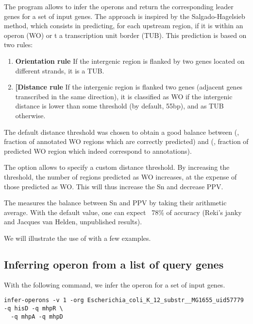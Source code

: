 The program  allows to infer the operons and
return the corresponding leader genes for a set of input genes.  The
approach is inspired by the Salgado-Hagelsieb method, which consists
in predicting, for each upstream region, if it is within an operon
(WO) or t a transcription unit border (TUB). This prediction is based
on two rules:

\begin{enumerate}
\item \textbf{Orientation rule} If the intergenic region is flanked by two
  genes located on different strands, it is a TUB.

\item \textbf{[Distance rule} If the intergenic region is flanked two
   genes (adjacent genes transcribed in the same
  direction), it is classified as WO if the intergenic distance is
  lower than some threshold (by default, 55bp), and as TUB otherwise.
\end{enumerate}

The default distance threshold was chosen to obtain a good balance
between  (, fraction of annotated WO
regions which are correctly predicted) and  (, fraction of predicted WO region
which indeed correspond to annotations).

The option  allows to specify a custom distance
threshold. By increasing the threshold, the number of regions
predicted as WO increases, at the expense of those predicted as
WO. This will thus increase the Sn and decrease PPV.

The  measures the balance between Sn and PPV by
taking their arithmetic average. With the default value, one can
expect ~78\% of accuracy (Reki's janky and Jacques van Helden,
unpublished results).

We will illustrate the use of  with a few
examples.
    
\subsection{Inferring operon from a list of query genes}

With the following command, we infer the operon for a set of input
genes.

\begin{lstlisting}
infer-operons -v 1 -org Escherichia_coli_K_12_substr__MG1655_uid57779 -q hisD -q mhpR \
  -q mhpA -q mhpD
\end{lstlisting}

